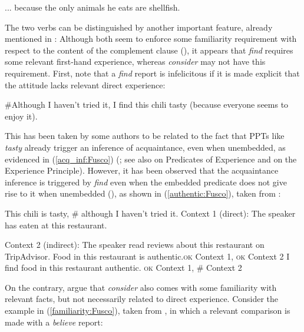 \documentclass[output=paper,colorlinks,citecolor=brown]{langscibook}
\begin{document}
 \label{consider_equal:Fusco}
\ex \label{consider_find_vegetarian:Fusco}
 \label{consider_vegetarian:Fusco}
 \label{find_vegetarian:Fusco}
\z
{... because the only animals he eats are shellfish.} 
\z


The two verbs can be distinguished by another important feature, already mentioned in : Although both seem to enforce some familiarity requirement with respect to the content of the complement clause (\cite{kennedy_willer_2022}), it appears that \textit{find} requires some relevant  first-hand experience, whereas \textit{consider} may not have this requirement. First, note that a \textit{find} report is infelicitous if it is made explicit that the attitude  lacks relevant direct experience: 

\ea \#Although I haven’t tried it, I find this chili tasty (because everyone seems 
to enjoy it).
\z

This has been taken by some authors to be related to the fact that PPTs like \textit{tasty} already trigger an inference of acquaintance, even when unembedded, as evidenced in (\ref{acq_inf:Fusco}) (\cite{ninan2014taste,ninan2020projection}; see also \cite{gunlogson_carlson_2016} on Predicates of Experience and  \cite{crespo2019tasting} on the Experience Principle). However, it has been observed that the acquaintance inference is triggered by \textit{find} even when the embedded predicate does not give rise to it when unembedded (\cite{korotkova_anand_find_2021,kennedy_willer_2022}), as shown in (\ref{authentic:Fusco}), taken from \citet{korotkova_anand_find_2021}:

\ea This chili is tasty, \# although I haven't tried it.\label{acq_inf:Fusco}
\ex Context 1 (direct): The speaker has eaten at this restaurant. \label{authentic:Fusco}

Context 2 (indirect): The speaker read reviews about this restaurant on TripAdvisor.
\ea Food in this restaurant is authentic.\hfill \textsc{ok} Context 1, \textsc{ok} Context 2
\ex I find food in this restaurant authentic. \hfill \textsc{ok} Context 1, \# Context 2
\z
\z

On the contrary, \citet{kennedy_willer_2022} argue that \textit{consider} also comes with some familiarity with relevant facts, but not necessarily related to direct experience. Consider the example in (\ref{familiarity:Fusco}), taken from \citet{kennedy_willer_2022}, in which a relevant comparison is made with a \textit{believe} report:
\end{document}
